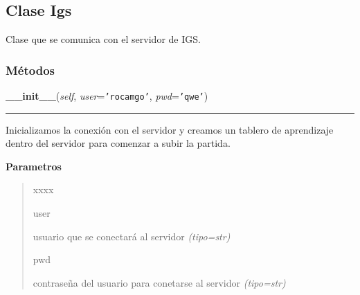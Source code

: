
\subsection{Clase Igs}

    \label{src:igs:Igs}

Clase que se comunica con el servidor de IGS.


  \subsubsection{Métodos}

    \label{src:igs:Igs:__init__}

    \vspace{0.5ex}

\hspace{.8\funcindent}\begin{boxedminipage}{\funcwidth}

    \raggedright \textbf{\_\_init\_\_}(\textit{self}, \textit{user}={\tt \texttt{'}\texttt{rocamgo}\texttt{'}}, \textit{pwd}={\tt \texttt{'}\texttt{qwe}\texttt{'}})

    \vspace{-1.5ex}

    \rule{\textwidth}{0.5\fboxrule}
\setlength{\parskip}{2ex}
Inicializamos la conexión con el servidor y creamos un tablero de aprendizaje dentro del servidor para comenzar a subir la partida.

\setlength{\parskip}{1ex}
      \textbf{Parametros}
      \vspace{-1ex}

      \begin{quote}
        \begin{Ventry}{xxxx}

          \item[user]


usuario que se conectará al servidor
            {\it (tipo=str)}

          \item[pwd]


contraseña del usuario para conetarse al servidor
            {\it (tipo=str)}

        \end{Ventry}

      \end{quote}

    \end{boxedminipage}

